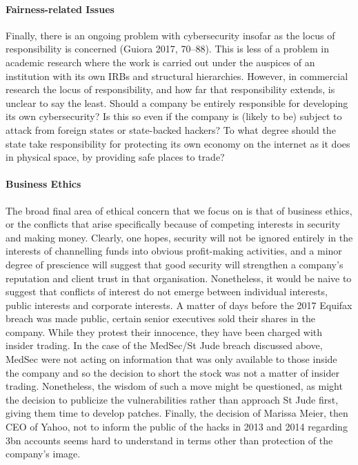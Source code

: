 \documentclass{svjour3}                     %
\begin{document}
\paragraph{Fairness-related Issues}
Finally, there is an ongoing problem with cybersecurity insofar as the locus of responsibility is concerned (Guiora 2017, 70–88). This is less of a problem in academic research where the work is carried out under the auspices of an institution with its own IRBs and structural hierarchies. However, in commercial research the locus of responsibility, and how far that responsibility extends, is unclear to say the least. Should a company be entirely responsible for developing its own cybersecurity? Is this so even if the company is (likely to be) subject to attack from foreign states or state-backed hackers? To what degree should the state take responsibility for protecting its own economy on the internet as it does in physical space, by providing safe places to trade?

\paragraph{Business Ethics}
The broad final area of ethical concern that we focus on is that of business ethics, or the conflicts that arise specifically because of competing interests in security and making money.  Clearly, one hopes, security will not be ignored entirely in the interests of channelling funds into obvious profit-making activities, and a minor degree of prescience will suggest that good security will strengthen a company’s reputation and client trust in that organisation.  Nonetheless, it would be naive to suggest that conflicts of interest do not emerge between individual interests, public interests and corporate interests. A matter of days before the 2017 Equifax breach was made public, certain senior executives sold their shares in the company. While they protest their innocence, they have been charged with insider trading. In the case of the MedSec/St Jude breach discussed above, MedSec were not acting on information that was only available to those inside the company and so the decision to short the stock was not a matter of insider trading. Nonetheless, the wisdom of such a move might be questioned, as might the decision to publicize the vulnerabilities rather than approach St Jude first, giving them time to develop patches. Finally, the decision of Marissa Meier, then CEO of Yahoo, not to inform the public of the hacks in 2013 and 2014 regarding 3bn accounts seems hard to understand in terms other than protection of the company’s image.
\end{document}
